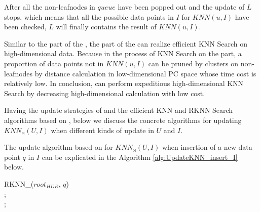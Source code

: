 After all the non-leafnodes in $queue$ have been popped out and the update of $L$ stops, which means that all the possible data points in $I$ for $KNN(u,I)$ have been checked, $L$ will finally contains the result of $KNN(u,I)$.  

Similar to the \hdrtree part of the \dualtree, the \deltatree part of the \dualtree can realize efficient KNN Search on high-dimensional data. Because in the process of KNN Search on the \deltatree part, a proportion of data points not in $KNN(u,I)$ can be pruned by clusters on non-leafnodes by distance calculation in low-dimensional PC space whose time cost is relatively low. In conclusion, \dualtree can perform expeditious high-dimensional KNN Search by decreasing high-dimensional calculation with low cost.

Having the update strategies of \dualtree and the efficient KNN and RKNN Search algorithms based on \dualtree, below we discuss the concrete algorithms for updating $KNN_{\bowtie}(U,I)$ when different kinds of update in $U$ and $I$.


The update algorithm based on \dualtree for $KNN_{\bowtie}(U,I)$ when insertion of a new data point $q$ in $I$ can be explicated in the Algorithm \ref{alg:UpdateKNN_insert_I} below. 

\begin{algorithm}[t]
\caption{KNN$_{\bowtie}$\_Insertion\_I($q$)} 
\label{alg:UpdateKNN_insert_I}
RKNN\_\dualtree($root_{HDR}$, $q$)\\
{
}   
;\\
;\\

\end{algorithm}

